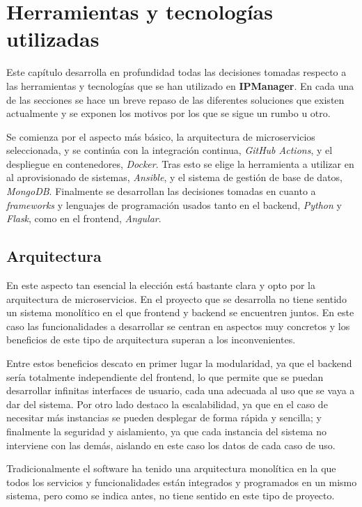 \chapter{Herramientas y tecnologías utilizadas}

Este capítulo desarrolla en profundidad todas las decisiones tomadas respecto a las herramientas y tecnologías que se han utilizado en \textbf{IPManager}. En cada una de las secciones se hace un breve repaso de las diferentes soluciones que existen actualmente y se exponen los motivos por los que se sigue un rumbo u otro.

Se comienza por el aspecto más básico, la arquitectura de microservicios seleccionada, y se continúa con la integración continua, \textit{GitHub Actions}, y el despliegue en contenedores, \textit{Docker}. Tras esto se elige la herramienta a utilizar en al aprovisionado de sistemas, \textit{Ansible}, y el sistema de gestión de base de datos, \textit{MongoDB}. Finalmente se desarrollan las decisiones tomadas en cuanto a \textit{frameworks} y lenguajes de programación usados tanto en el backend, \textit{Python} y \textit{Flask}, como en el frontend, \textit{Angular}.

\section{Arquitectura}

En este aspecto tan esencial la elección está bastante clara y opto por la arquitectura de microservicios. En el proyecto que se desarrolla no tiene sentido un sistema monolítico en el que frontend y backend se encuentren juntos. En este caso las funcionalidades a desarrollar se centran en aspectos muy concretos y los beneficios de este tipo de arquitectura superan a los inconvenientes.

Entre estos beneficios descato en primer lugar la modularidad, ya que el backend sería totalmente independiente del frontend, lo que permite que se puedan desarrollar infinitas interfaces de usuario, cada una adecuada al uso que se vaya a dar del sistema. Por otro lado destaco la escalabilidad, ya que en el caso de necesitar más instancias se pueden desplegar de forma rápida y sencilla; y finalmente la seguridad y aislamiento, ya que cada instancia del sistema no interviene con las demás, aislando en este caso los datos de cada caso de uso.

Tradicionalmente el software ha tenido una arquitectura monolítica en la que todos los servicios y funcionalidades están integrados y programados en un mismo sistema, pero como se indica antes, no tiene sentido en este tipo de proyecto.

